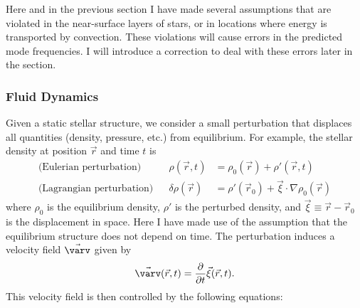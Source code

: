 Here and in the previous section I have made several assumptions that are violated in the near-surface layers of stars, or in locations where energy is transported by convection. 
These violations will cause errors in the predicted mode frequencies. 
I will introduce a correction to deal with these errors later in the section. 

\subsubsection*{Fluid Dynamics}
Given a static stellar structure, we consider a small perturbation that displaces all quantities (density, pressure, etc.) from equilibrium. %
For example, the stellar density at position $\vec r$ and time $t$ is 
\begin{align}
    \text{(Eulerian perturbation)} && 
    \rho (\vec r, t)
    &= \label{eq:eulerean}
    \rho_0 (\vec r) 
    + 
    \rho' (\vec r, t)
    \\
    \text{(Lagrangian perturbation)} &&
    \delta\rho(\vec r)
    &= \label{eq:lagrangian}
    \rho'(\vec r_0)
    +
    \vec\xi \cdot \nabla\rho_0 (\vec r)
\end{align}
where $\rho_0$ is the equilibrium density, $\rho'$ is the perturbed density, and ${\vec\xi\equiv\vec r - \vec r_0}$ is the displacement in space.
Here I have made use of the assumption that the equilibrium structure does not depend on time. 
The perturbation induces a velocity field $\vec{\varv}$ given by 
\begin{equation}
    \vec{\varv} (\vec r, t) 
    = 
    \frac{\partial}{\partial t}\vec\xi (\vec r, t).
\end{equation}
This velocity field is then controlled by the following equations: 

